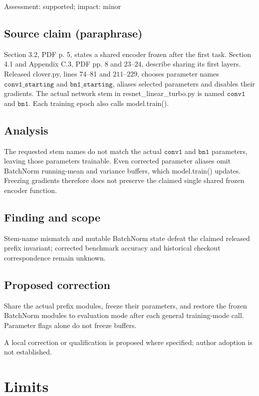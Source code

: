 \documentclass[11pt]{article}
\begin{document}
Assessment: supported; impact: minor

\subsection*{Source claim (paraphrase)}

Section 3.2, PDF p. 5, states a shared encoder frozen after the first task. Section 4.1 and Appendix C.3, PDF pp. 8 and \(23\)–\(24\), describe sharing its first layers. Released clover.py, lines 74–81 and \(211\)–\(229\), chooses parameter names \(\texttt{conv1\_starting}\) and \(\texttt{bn1\_starting}\), aliases selected parameters and disables their gradients. The actual network stem in resnet\_linear\_turbo.py is named \(\texttt{conv1}\) and \(\texttt{bn1}\). Each training epoch also calls model.train().

\subsection*{Analysis}

The requested stem names do not match the actual \(\texttt{conv1}\) and \(\texttt{bn1}\) parameters, leaving those parameters trainable. Even corrected parameter aliases omit BatchNorm running-mean and variance buffers, which model.train() updates. Freezing gradients therefore does not preserve the claimed single shared frozen encoder function.

\subsection*{Finding and scope}

Stem-name mismatch and mutable BatchNorm state defeat the claimed released prefix invariant; corrected benchmark accuracy and historical checkout correspondence remain unknown.

\subsection*{Proposed correction}

Share the actual prefix modules, freeze their parameters, and restore the frozen BatchNorm modules to evaluation mode after each general training-mode call. Parameter flags alone do not freeze buffers.

A local correction or qualification is proposed where specified; author adoption is not established.

\section*{Limits}
\end{document}
